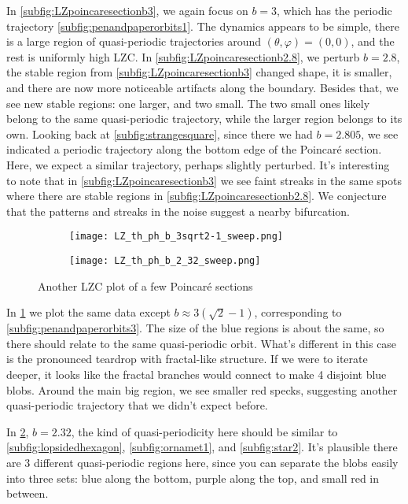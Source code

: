 In \cref{subfig:LZpoincaresectionb3}, we again focus on $b=3$, which has the periodic trajectory \cref{subfig:penandpaperorbits1}. The dynamics appears to be simple, there is a large region of quasi-periodic trajectories around $(\theta,\varphi)=(0,0)$, and the rest is uniformly high LZC. In \cref{subfig:LZpoincaresectionb2.8}, we perturb $b=2.8$, the stable region from \ref{subfig:LZpoincaresectionb3} changed shape, it is smaller, and there are now more noticeable artifacts along the boundary. Besides that, we see new stable regions: one larger, and two small. The two small ones likely belong to the same quasi-periodic trajectory, while the larger region belongs to its own. Looking back at \cref{subfig:strangesquare}, since there we had $b=2.805$, we see indicated a periodic trajectory along the bottom edge of the Poincar\'e section. Here, we expect a similar trajectory, perhaps slightly perturbed. It's interesting to note that in \cref{subfig:LZpoincaresectionb3} we see faint streaks in the same spots where there are stable regions in \cref{subfig:LZpoincaresectionb2.8}. We conjecture that the patterns and streaks in the noise suggest a nearby bifurcation.

\begin{figure}[!th]
\centering
\begin{subfigure}[h]{0.49\textwidth}
\centering
\texttt{[image: LZ\_th\_ph\_b\_3sqrt2-1\_sweep.png]}
\caption{}
\label{subfig:LZpoincaresectionb1242}
\end{subfigure}
%
\begin{subfigure}[h]{0.49\textwidth}
\centering
\texttt{[image: LZ\_th\_ph\_b\_2\_32\_sweep.png]}
\caption{}
\label{subfig:LZpoincaresectionb232}
\end{subfigure}
\caption{Another  LZC plot of a few Poincar\'e sections}
\label{fig:LZpoincare2}
\end{figure}
In \cref{subfig:LZpoincaresectionb1242} we plot the same data except $b\approx3(\sqrt2-1)$, corresponding to \cref{subfig:penandpaperorbits3}. The size of the blue regions is about the same, so there should relate to the same quasi-periodic orbit. What's different in this case is the pronounced teardrop with fractal-like structure. If we were to iterate deeper, it looks like the fractal branches would connect to make 4 disjoint blue blobs. Around the main big region, we see smaller red specks, suggesting another quasi-periodic trajectory that we didn't expect before.

In \cref{subfig:LZpoincaresectionb232}, $b=2.32$, the kind of quasi-periodicity here should be similar to \ref{subfig:lopsidedhexagon}, \ref{subfig:ornamet1}, and \ref{subfig:star2}. It's plausible there are 3 different quasi-periodic regions here, since you can separate the blobs easily into three sets: blue along the bottom, purple along the top, and small red in between.

